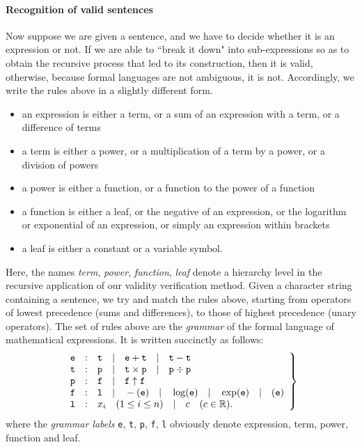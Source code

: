 \documentclass[a4paper]{book}
\theoremstyle{changebreak}                %
\begin{document}
\paragraph{Recognition of valid sentences}
Now suppose we are given a sentence, and we have to decide whether it
is an expression or not. If we are able to ``break
it down" into sub-expressions so as to obtain the recursive
process that led to its construction, then it is
valid, otherwise, because formal languages are not
ambiguous, it is not. Accordingly, we write the rules
above in a slightly different form.
\begin{itemize}
\item an expression is either a term, or a sum of an expression with a
  term, or a difference of terms
\item a term is either a power, or a multiplication of a term by a
  power, or a division of powers
\item a power is either a function, or a function to the power of a
  function
\item a function is either a leaf, or the negative of an
  expression, or the logarithm or exponential of an expression, or
  simply an expression within brackets
\item a leaf is either a constant or a variable
  symbol.
\end{itemize}
Here, the names {\it term}, {\it power}, {\it function}, {\it leaf}
denote a hierarchy level in the recursive application of our validity
verification method. Given a character string containing a sentence,
we try and match the rules above, starting from operators of lowest
precedence (sums and differences), to those
of highest precedence (unary operators). The set of rules above are
the {\it grammar} of the formal language of
mathematical expressions. It is written succinctly as follows:
\begin{equation}
\left.\begin{array}{rcl}
  {\tt e} & : & {\tt t} \quad|\quad {\tt e} + {\tt t} \quad|\quad {\tt
    t} - {\tt t} \\ 
  {\tt t} & : & {\tt p} \quad|\quad {\tt t} \times {\tt p} \quad|\quad
  {\tt p}\div {\tt p} \\ 
  {\tt p} & : & {\tt f} \quad|\quad {\tt f}\uparrow{\tt f} \\ 
  {\tt f} & : & {\tt l} \quad|\quad -({\tt e}) \quad|\quad \log({\tt
    e}) \quad|\quad \exp({\tt e}) \quad|\quad ({\tt e}) \\ 
  {\tt l} & : & x_i \quad (1\le i\le n) \quad|\quad c  \quad (c\in\mathbb{R}).
\end{array} \right\}
\label{eq:grammar}
\end{equation}
where the {\it grammar labels} {\tt e}, {\tt t},
{\tt p}, {\tt f}, {\tt l} obviously denote expression, term, power,
function and leaf.
\end{document}

